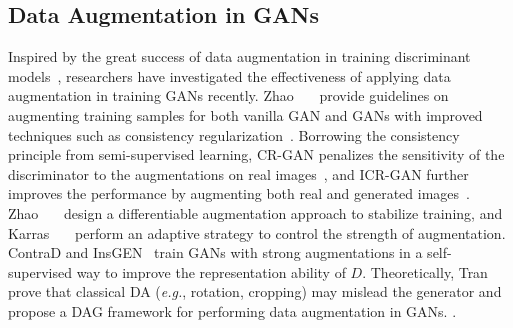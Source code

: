 \subsection{Data Augmentation in GANs}
\label{Sec:RelatedDA}
Inspired by the great success of data augmentation in training discriminant models~\cite{zhang2018mixup, shorten2019survey}, researchers have investigated the effectiveness of applying data augmentation in training GANs recently.
Zhao~\etal~~\cite{zhao2020image} provide guidelines on augmenting training samples for both vanilla GAN and GANs with improved techniques such as consistency regularization~\cite{CR2020}.
Borrowing the consistency principle from semi-supervised learning, CR-GAN penalizes the sensitivity of the discriminator to the augmentations on real images~\cite{CR2020}, and ICR-GAN further improves the performance by augmenting both real and generated images~\cite{zhao2020improved}.
Zhao~\etal~~\cite{DiffAug} design a differentiable augmentation approach to stabilize training, and Karras~\etal~~\cite{karras2020training} perform an adaptive strategy to control the strength of augmentation.
ContraD\cite{jeong2021training} and InsGEN~\cite{yang2021insgen} train GANs with strong augmentations in a self-supervised way to improve the representation ability of $D$.
Theoretically, Tran~\etal~\cite{tran2021on} prove that classical DA (\emph{e.g.}, rotation, cropping) may mislead the generator and propose a DAG framework for performing data augmentation in GANs.
.